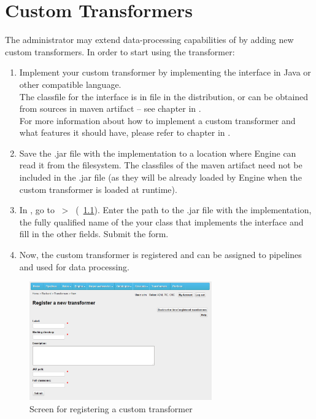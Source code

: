 \chapter{Custom Transformers}
\label{chap:customTransformers}
The administrator may extend data-processing capabilities of \odcs by adding new custom transformers. In order to start using the transformer:
\begin{enumerate}
  \item Implement your custom transformer by implementing the  interface in Java or other compatible language.\\
  The classfile for the  interface is in  file in the \odcs distribution, or can be obtained from sources in  maven artifact -- see chapter  in . \\
  For more information about how to implement a custom transformer and what features it should have, please refer to chapter  in .
  \item Save the .jar file with the implementation to a location where Engine can read it from the filesystem. The classfiles of the  maven artifact need not be included in the .jar file (as they will be already loaded by Engine when the custom transformer is loaded at runtime).
  \item In \FE, go to ~\textgreater~ (\figurename~\ref{fig:customTransformer}). Enter the path to the .jar file with the implementation, the fully qualified name of the your class that implements the  interface and fill in the other fields. Submit the form.
  \item Now, the custom transformer is registered and can be assigned to pipelines and used for data processing.
\end{enumerate}

\begin{figure}[h]
    \centering
    \includegraphics[width=0.7\textwidth]{images/fe-custom-transformer.png}
    \caption{Screen for registering a custom transformer}
    \label{fig:customTransformer}
\end{figure}


